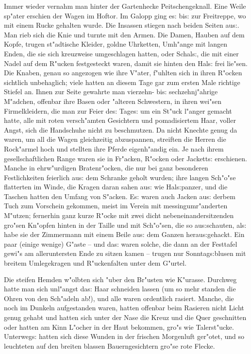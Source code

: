 \documentclass[oneside,12pt]{book}
\newcommand{\s}{s:}%
\begin{document}
Immer wieder vernahm man hinter der Gartenhecke Peitschengeknall.
Eine Weile sp"ater erschien der Wagen im Hoftor. Im Galopp ging
e{\s} bi{\s} zur Freitreppe, wo mit einem Rucke gehalten wurde.
Die Insassen stiegen nach beiden Seiten au{\s}. Man rieb sich die
Knie und turnte mit den Armen. Die Damen, Hauben auf dem Kopfe,
trugen st"adtische Kleider, goldne Uhrketten, Umh"ange mit langen
Enden, die sie sich kreuzweise umgeschlagen hatten, oder
Schal{\s}, die mit einer Nadel auf dem R"ucken festgesteckt waren,
damit sie hinten den Hal{\s} frei lie"sen. Die Knaben, genau so
angezogen wie ihre V"ater, f"uhlten sich in ihren R"ocken
sichtlich unbehaglich; viele hatten an diesem Tage gar zum ersten
Male richtige Stiefel an. Ihnen zur Seite gewahrte man vierzehn-
bi{\s} sechzehnj"ahrige M"adchen, offenbar ihre Basen oder
"alteren Schwestern, in ihren wei"sen Firmelkleidern, die man zur
Feier de{\s} Tage{\s} um ein St"uck l"anger gemacht hatte, alle
mit roten versch"amten Gesichtern und pomadisiertem Haar, voller
Angst, sich die Handschuhe nicht zu beschmutzen. Da nicht Knechte
genug da waren, um all die Wagen gleichzeitig abzuspannen,
streiften die Herren die Rock"armel hoch und stellten ihre Pferde
eigenh"andig ein. Je nach ihrem gesellschaftlichen Range waren sie
in Fr"acken, R"ocken oder Jackett{\s} erschienen. Manche in
ehrw"urdigen Bratenr"ocken, die nur bei ganz besonderen
Festlichkeiten feierlich au{\s} dem Schranke geholt wurden; ihre
langen Sch"o"se flatterten im Winde, die Kragen daran sahen au{\s}
wie Hal{\s}panzer, und die Taschen hatten den Umfang von S"acken.
E{\s} waren auch Jacken au{\s} derbem Tuch zum Vorschein gekommen,
meist im Verein mit messingumr"anderten M"utzen; fernerhin ganz
kurze R"ocke mit zwei dicht nebeneinandersitzenden gro"sen
Kn"opfen hinten in der Taille und mit Sch"o"sen, die so
au{\s}schauten, al{\s} habe sie der Zimmermann mit einem Beile
au{\s} dem Ganzen herau{\s}gehackt. Ein paar (einige wenige)
G"aste -- und da{\s} waren solche, die dann an der Festtafel
gewi"s am alleruntersten Ende zu sitzen kamen -- trugen nur
Sonntag{\s}blusen mit breitem Umlegekragen und R"uckenfalten unter
dem G"urtel.

Die steifen Hemden w"olbten sich "uber den Br"usten wie K"urasse.
Durchweg hatte man sich unl"angst da{\s} Haar schneiden lassen (um
so mehr standen die Ohren von den Sch"adeln ab!), und alle waren
ordentlich rasiert. Manche, die noch im Dunkeln aufgestanden
waren, hatten offenbar beim Rasieren nicht Licht genug gehabt und
hatten sich unter der Nase die Kreuz und die Quer geschnitten oder
hatten am Kinn L"ocher in der Haut bekommen, gro"s wie
Talerst"ucke. Unterweg{\s} hatten sich diese Wunden in der
frischen Morgenluft ger"otet, und so leuchteten auf den breiten
blassen Bauerngesichtern gro"se rote Flecke.
\end{document}
